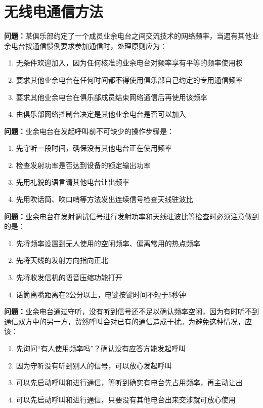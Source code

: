 \chapter{无线电通信方法}

\textbf{问题：}某俱乐部约定了一个成员业余电台之间交流技术的网络频率，当遇有其他业余电台按通信惯例要求参加通信时，处理原则应为：
\begin{enumerate}[label=\Alph*), leftmargin=3em]
	\item 无条件欢迎加入，因为任何核准的业余电台对频率享有平等的频率使用权
	\item 要求其他业余电台在任何时间都不得使用俱乐部自己约定的专用通信频率
	\item 要求其他业余电台在俱乐部成员结束网络通信后再使用该频率
	\item 由俱乐部网络控制台决定是其他业余电台是否可以加入
\end{enumerate}

\textbf{问题：}业余电台在发起呼叫前不可缺少的操作步骤是：
\begin{enumerate}[label=\Alph*), leftmargin=3em]
	\item 先守听一段时间，确保没有其他电台正在使用频率
	\item 检查发射功率是否达到设备的额定输出功率
	\item 先用礼貌的语言请其他电台让出频率
	\item 先用吹话筒、吹口哨等方法发出连续信号检查天线驻波比
\end{enumerate}

\textbf{问题：}业余电台在发射调试信号进行发射功率和天线驻波比等检查时必须注意做到的是：
\begin{enumerate}[label=\Alph*), leftmargin=3em]
	\item 先将频率设置到无人使用的空闲频率、偏离常用的热点频率
	\item 先将天线的发射方向指向正北
	\item 先将收发信机的语音压缩功能打开
	\item 话筒离嘴距离在2公分以上，电键按键时间不短于5秒钟
\end{enumerate}

\textbf{问题：}业余电台通过守听，没有听到信号还不足以确认频率空闲，因为有时听不到通信双方中的另一方，贸然呼叫会对已有的通信造成干扰。为避免这种情况，应该：
\begin{enumerate}[label=\Alph*), leftmargin=3em]
	\item 先询问“有人使用频率吗”？确认没有应答方能发起呼叫
	\item 因为守听没有听到别人的信号，可以放心发起呼叫
	\item 可以先启动呼叫和进行通信，等听到确实有电台先占用频率，再主动让出
	\item 可以先启动呼叫和进行通信，只要没有其他电台出来交涉就可放心使用
\end{enumerate}

